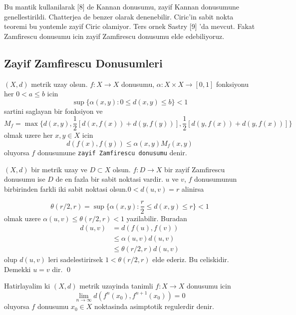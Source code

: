 \documentclass[10pt]{amsart}
\theoremstyle{plain}
\theoremstyle{definition}
\begin{document}
Bu mantik kullanilarak [8] de Kannan donusumu, zayif Kannan donusumune genellestirildi. Chatterjea de benzer olarak denenebilir. Ciric'in sabit nokta teoremi bu yontemle zayif Ciric olamiyor. Ters ornek Sastry [9] 'da mevcut. Fakat Zamfirescu donusumu icin zayif Zamfirescu donusumu elde edebiliyoruz.

\subsection*{Zayif Zamfirescu Donusumleri}
   $(X,d)$ metrik uzay olsun. $f:X \rightarrow X$ donusumu,
 $\alpha :X\times X \rightarrow [0,1]$ fonksiyonu her $0<a\leq b$ icin 
\begin{equation*} 
  \sup\big\{\alpha(x,y) : 0\leq d(x,y) \leq b \big\} < 1
\end{equation*}
sartini saglayan bir fonksiyon ve
\begin{equation*} 
  M_f= \max\bigg\{ d(x,y), \frac{1}{2}[d(x,f(x))+d(y,f(y))], \frac{1}{2}[d(y,f(x))+d(y,f(x))] \bigg\}
\end{equation*}
olmak uzere her $x,y\in X$ icin
\begin{equation*} 
  d(f(x), f(y))\leq \alpha(x,y)M_f(x,y) 
\end{equation*}
oluyorsa $f$ donusumune \texttt{zayif Zamfirescu donusumu} denir.

\proposition  $(X,d)$ bir metrik uzay ve $D \subset X$ olsun. $f:D\rightarrow X$ bir zayif Zamfirescu donusumu ise $D$ de en fazla bir sabit noktasi vardir.
\kanit $u$ ve $v$, $f$ donusumunun birbirinden farkli iki sabit noktasi olsun.$0<d(u,v)=r$ alinirsa

\begin{equation*}
  \theta(r/2,r)= \sup\big\{\alpha(x,y) : \frac{r}{2}\leq d(x,y) \leq r \big\} < 1
\end{equation*}
olmak uzere  $\alpha(u,v)\leq \theta(r/2, r)<1$ yazilabilir. Buradan
\begin{align*}
d(u,v)&=d(f(u),f(v))\\ &\leq \alpha(u,v)d(u,v)\\
                    &\leq \theta(r/2,r)d(u,v)
\end{align*}
olup $d(u,v)$ leri sadelestirirsek $1<\theta(r/2,r)$ elde ederiz. Bu celiskidir. Demekki $u=v$ dir. \qed

\newpage
 Hatirlayalim ki $(X, d)$ metrik uzayinda tanimli $f: X\rightarrow X$ donusumu icin
  \begin{equation*}
    \lim_{n\rightarrow \infty}d(f^n(x_0),f^{n+1}(x_0))=0 
  \end{equation*}
oluyorsa $f$ donusumu $x_0\in X$ noktasinda asimptotik regulerdir denir.
\end{document}
